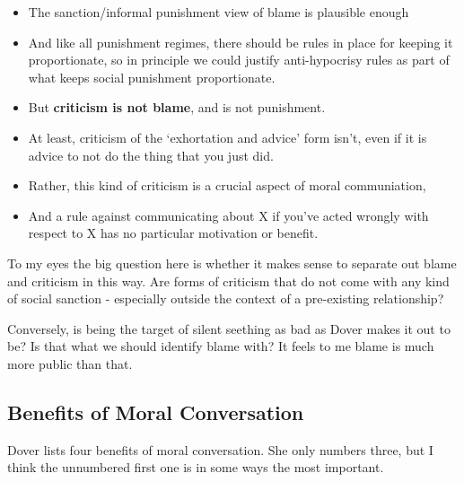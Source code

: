 \documentclass[
]{article}
\providecommand{\tightlist}{%
  \setlength{\itemsep}{0pt}\setlength{\parskip}{0pt}}
\begin{document}
\begin{itemize}
\tightlist
\item
  The sanction/informal punishment view of blame is plausible enough
\item
  And like all punishment regimes, there should be rules in place for
  keeping it proportionate, so in principle we could justify
  anti-hypocrisy rules as part of what keeps social punishment
  proportionate.
\item
  But \textbf{criticism is not blame}, and is not punishment.
\item
  At least, criticism of the `exhortation and advice' form isn't, even
  if it is advice to not do the thing that you just did.
\item
  Rather, this kind of criticism is a crucial aspect of moral
  communiation,
\item
  And a rule against communicating about X if you've acted wrongly with
  respect to X has no particular motivation or benefit.
\end{itemize}

To my eyes the big question here is whether it makes sense to separate
out blame and criticism in this way. Are forms of criticism that do not
come with any kind of social sanction - especially outside the context
of a pre-existing relationship?

Conversely, is being the target of silent seething as bad as Dover makes
it out to be? Is that what we should identify blame with? It feels to me
blame is much more public than that.

\newpage

\hypertarget{benefits-of-moral-conversation}{%
\subsection{Benefits of Moral
Conversation}\label{benefits-of-moral-conversation}}

Dover lists four benefits of moral conversation. She only numbers three,
but I think the unnumbered first one is in some ways the most important.
\end{document}
